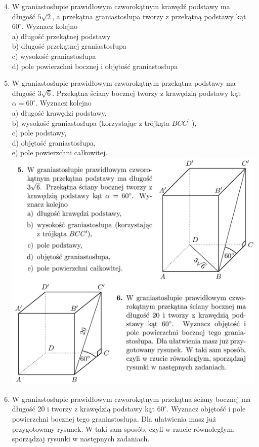 \documentclass[10pt]{article}
\begin{document}
\begin{enumerate}
  \setcounter{enumi}{3}
  \item W graniastosłupie prawidłowym czworokątnym krawędź podstawy ma długość \(5 \sqrt{2}\), a przekątna graniastosłupa tworzy z przekątną podstawy kąt \(60^{\circ}\). Wyznacz kolejno\\
a) długość przekątnej podstawy\\
b) długość przekątnej graniastosłupa\\
c) wysokość graniastosłupa\\
d) pole powierzchni bocznej i objętość graniastosłupa
  \item W graniastosłupie prawidłowym czworokątnym przekątna podstawy ma długość \(3 \sqrt{6}\). Przekątna ściany bocznej tworzy z krawędzią podstawy kąt \(\alpha=60^{\circ}\). Wyznacz kolejno\\
a) długość krawędzi podstawy,\\
b) wysokość graniastosłupa (korzystając z trójkąta \(B C C^{\prime}\) ),\\
c) pole podstawy,\\
d) objętość graniastosłupa,\\
e) pole powierzchni całkowitej.\\
\includegraphics[max width=\textwidth, center]{2024_11_21_e9b4faa005d5be2cc318g-079}
  \item W graniastosłupie prawidłowym czworokątnym przekątna ściany bocznej ma długość 20 i tworzy z krawędzią podstawy kąt \(60^{\circ}\). Wyznacz objętość i pole powierzchni bocznej tego graniastosłupa. Dla ułatwienia masz już przygotowany rysunek. W taki sam sposób, czyli w rzucie równoległym, sporządzaj rysunki w następnych zadaniach.

\end{enumerate}
\end{document}
